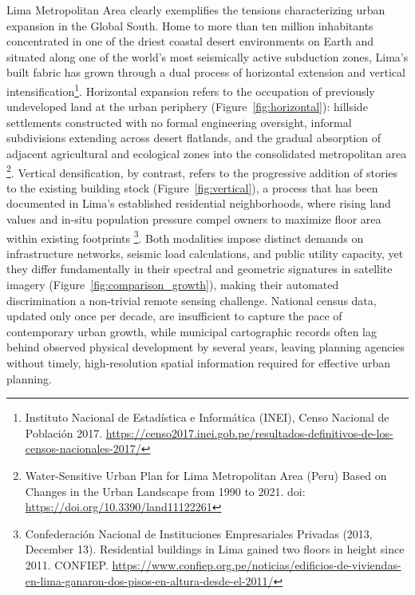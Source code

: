 Lima Metropolitan Area clearly exemplifies the tensions characterizing urban expansion in the Global South. Home to more than ten million inhabitants concentrated in one of the driest coastal desert environments on Earth and situated along one of the world's most seismically active subduction zones, Lima's built fabric has grown through a dual process of horizontal extension and vertical intensification\footnote{Instituto Nacional de Estadística e Informática (INEI), Censo Nacional de Población 2017. \url{https://censo2017.inei.gob.pe/resultados-definitivos-de-los-censos-nacionales-2017/}}. Horizontal expansion refers to the occupation of previously undeveloped land at the urban periphery (Figure~\ref{fig:horizontal}): hillside settlements constructed with no formal engineering oversight, informal subdivisions extending across desert flatlands, and the gradual absorption of adjacent agricultural and ecological zones into the consolidated metropolitan area \footnote{Water-Sensitive Urban Plan for Lima Metropolitan Area (Peru) Based on Changes in the Urban Landscape from 1990 to 2021. doi: \url{https://doi.org/10.3390/land11122261}}. Vertical densification, by contrast, refers to the progressive addition of stories to the existing building stock (Figure~\ref{fig:vertical}), a process that has been documented in Lima's established residential neighborhoods, where rising land values and in-situ population pressure compel owners to maximize floor area within existing footprints \footnote{Confederación Nacional de Instituciones Empresariales Privadas (2013, December 13). Residential buildings in Lima gained two floors in height since 2011. CONFIEP. \url{https://www.confiep.org.pe/noticias/edificios-de-viviendas-en-lima-ganaron-dos-pisos-en-altura-desde-el-2011/}}. Both modalities impose distinct demands on infrastructure networks, seismic load calculations, and public utility capacity, yet they differ fundamentally in their spectral and geometric signatures in satellite imagery (Figure~\ref{fig:comparison_growth}), making their automated discrimination a non-trivial remote sensing challenge. National census data, updated only once per decade, are insufficient to capture the pace of contemporary urban growth, while municipal cartographic records often lag behind observed physical development by several years, leaving planning agencies without timely, high-resolution spatial information required for effective urban planning.

